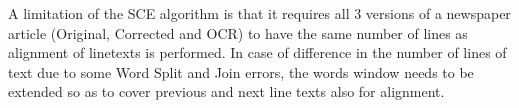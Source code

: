 \documentclass[12pt]{article}
\begin{document}

A limitation of the SCE algorithm is that it requires all 3 versions of a newspaper article (Original, Corrected and OCR) to have the same number of lines as alignment of linetexts is performed. In case of difference in the number of lines of text due to some Word Split and Join errors, the words window needs to be extended so as to cover previous and next line texts also for alignment.
\end{document}
